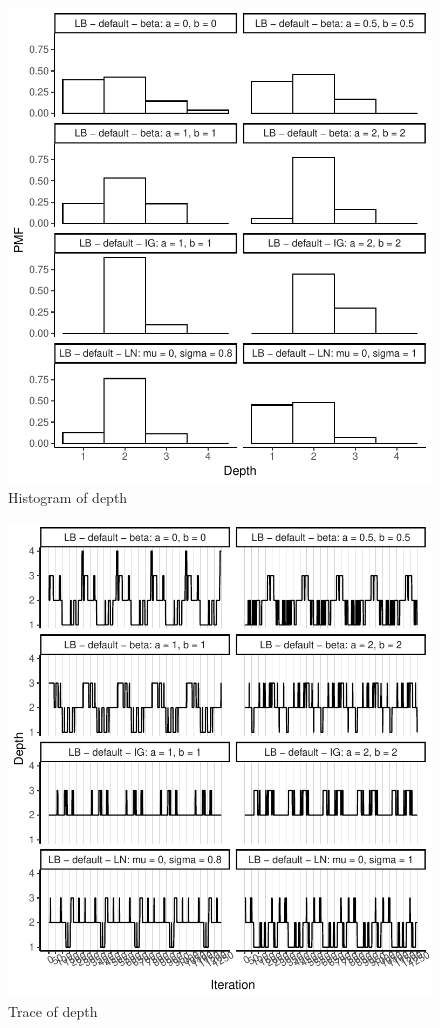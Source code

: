 \documentclass{amsart}
\begin{document}
%
\begin{figure}[ht]
	\centering
	\includegraphics[width=0.95\linewidth]{hist_depth_4.pdf}
	\caption{Histogram of depth}
	\label{fig:hist:depth:4}
\end{figure}

\begin{figure}[ht]
	\centering
	\includegraphics[width=0.95\linewidth]{trace_depth_4.pdf}
	\caption{Trace of depth}
	\label{fig:trace:depth:4}
\end{figure}
\end{document}

